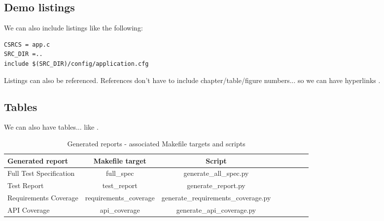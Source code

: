 \subsection{Demo listings}

We can also include listings like the following:

\lstset{language=make,caption=Application Makefile,label=lst:app-make}
\begin{lstlisting}
CSRCS = app.c
SRC_DIR =..
include $(SRC_DIR)/config/application.cfg
\end{lstlisting}

Listings can also be referenced. References don't have to include chapter/table/figure numbers... so we can have hyperlinks .

\subsection{Tables}

We can also have tables... like .

\begin{center}
\begin{table}[htb]
  \caption{Generated reports - associated Makefile targets and scripts}
  \begin{tabular}{l*{6}{c}r}
    Generated report & Makefile target & Script \\
    \hline
    Full Test Specification & full_spec & generate_all_spec.py  \\
    Test Report & test_report & generate_report.py  \\
    Requirements Coverage & requirements_coverage &
    generate_requirements_coverage.py   \\
    API Coverage & api_coverage & generate_api_coverage.py  \\
  \end{tabular}
  \label{table:reports}
\end{table}
\end{center}
